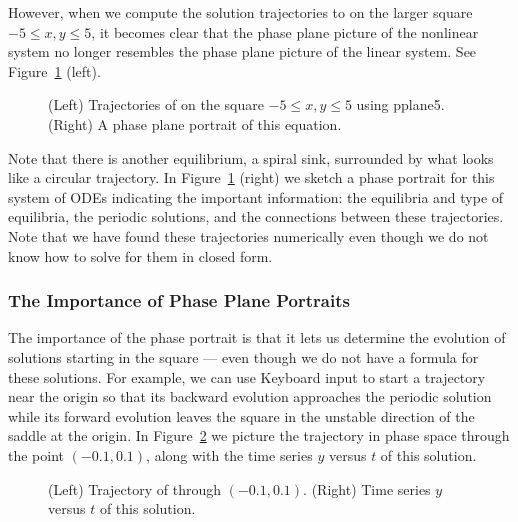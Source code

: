 \documentclass{ximera}
\begin{document}
However, when we compute the solution trajectories to
 on the larger square $-5\leq x,y\leq 5$, it
becomes clear that the phase plane picture of 
the nonlinear
system no longer resembles the phase plane picture of the linear
system.  See Figure~\ref{F:globalb} (left).
\begin{figure}[htb]
           \centerline{%
           }
           \caption{(Left) Trajectories of \protect{} 
on the square $-5\leq x,y \leq 5$ using {\sf pplane5}. (Right) A
phase plane portrait of this equation.}
           \label{F:globalb}
\end{figure}
Note that there is another equilibrium, a spiral sink,
surrounded by what looks like a circular trajectory.  In 
Figure~\ref{F:globalb} (right) we sketch a phase portrait for 
this system of ODEs indicating the important information: 
the equilibria and type of equilibria, the periodic solutions,
and the connections between these trajectories.  Note that we have found
these trajectories numerically even though we do not know how to solve for
them in closed form.

\subsubsection*{The Importance of Phase Plane Portraits}

The importance of the phase portrait is that it lets us determine the 
evolution of solutions starting in the square --- even though we do not 
have a formula for these solutions.  For example, we can use 
{\sf Keyboard input} to start a trajectory near the origin so
that its backward evolution
approaches the periodic solution
while its forward evolution leaves the square in the unstable
direction of the saddle at 
the origin.  In Figure~\ref{F:nltraj}
we picture the trajectory in phase space through the point 
$(-0.1,0.1)$, along with the time series $y$ versus $t$ of this
solution.  

\begin{figure}[htb]
           \centerline{%
           }
           \caption{(Left) Trajectory of \protect{} 
	through $(-0.1,0.1)$. (Right) Time series $y$ versus $t$ of
this solution.}
           \label{F:nltraj}
\end{figure}
\end{document}
